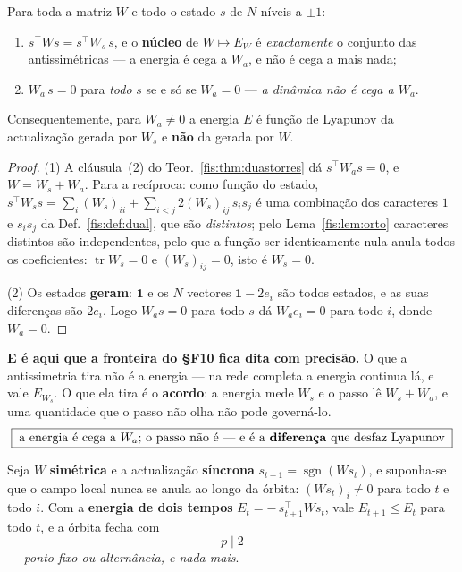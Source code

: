 \documentclass[livro.tex]{subfiles}
\begin{document}
\begin{proposicao}\label{fis:prop:cego}
Para toda a matriz $W$ e todo o estado $s$ de $N$ níveis a $\pm1$:
\begin{enumerate}\itemsep3pt
\item[(1)] $s^{\!\top}Ws=s^{\!\top}W_s\,s$, e o \textbf{núcleo} de $W\mapsto E_W$
é \emph{exactamente} o conjunto das antissimétricas --- a energia é cega a $W_a$,
e não é cega a mais nada;
\item[(2)] $W_a\,s=0$ para \emph{todo} $s$ se e só se $W_a=0$ --- \emph{a
dinâmica não é cega a $W_a$}.
\end{enumerate}
Consequentemente, para $W_a\neq0$ a energia $E$ é função de Lyapunov da
actualização gerada por $W_s$ e \textbf{não} da gerada por $W$.
\end{proposicao}

\begin{proof}
(1) A cláusula~(2) do Teor.~\ref{fis:thm:duastorres} dá $s^{\!\top}W_as=0$, e
$W=W_s+W_a$. Para a recíproca: como função do estado,
$s^{\!\top}W_ss=\sum_i(W_s)_{ii}+\sum_{i<j}2(W_s)_{ij}\,s_is_j$ é uma combinação
dos caracteres $1$ e $s_is_j$ da Def.~\ref{fis:def:dual}, que são
\emph{distintos}; pelo Lema~\ref{fis:lem:orto} caracteres distintos são
independentes, pelo que a função ser identicamente nula anula todos os
coeficientes: $\operatorname{tr}W_s=0$ e $(W_s)_{ij}=0$, isto é $W_s=0$.

(2) Os estados \textbf{geram}: $\mathbf{1}$ e os $N$ vectores $\mathbf{1}-2e_i$
são todos estados, e as suas diferenças são $2e_i$. Logo $W_as=0$ para todo $s$
dá $W_ae_i=0$ para todo $i$, donde $W_a=0$.
\end{proof}

\medskip\noindent\textbf{E é aqui que a fronteira do §F10 fica dita com
precisão.} O que a antissimetria tira não é a energia --- na rede completa a
energia continua lá, e vale $E_{W_s}$. O que ela tira é o \textbf{acordo}: a
energia mede $W_s$ e o passo lê $W_s+W_a$, e uma quantidade que o passo não olha
não pode governá-lo.
\[
\boxed{\;\text{a energia é cega a }W_a\text{; o passo não é ---
e é a \textbf{diferença} que desfaz Lyapunov}\;}
\]

\begin{teorema}\label{fis:thm:goles}
Seja $W$ \textbf{simétrica} e a actualização \textbf{síncrona}
$s_{t+1}=\operatorname{sgn}(Ws_t)$, e suponha-se que o campo local nunca se anula
ao longo da órbita: $(Ws_t)_i\neq0$ para todo $t$ e todo $i$. Com a
\textbf{energia de dois tempos} $E_t=-\,s_{t+1}^{\!\top}W s_t$, vale
$E_{t+1}\le E_t$ para todo $t$, e a órbita fecha com
\[
\boxed{\;p\mid2\;}
\]
--- \emph{ponto fixo ou alternância, e nada mais}.
\end{teorema}
\end{document}

